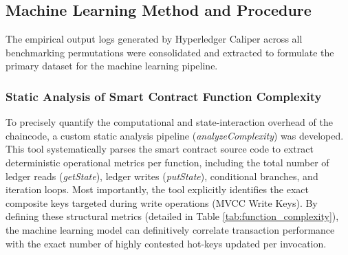 \documentclass[12pt]{article}
\begin{document}
\subsection{Machine Learning Method and Procedure}

The empirical output logs generated by Hyperledger Caliper across all benchmarking permutations were consolidated and extracted to formulate the primary dataset for the machine learning pipeline.

\subsubsection{Static Analysis of Smart Contract Function Complexity}

To precisely quantify the computational and state-interaction overhead of the chaincode, a custom static analysis pipeline (\textit{analyzeComplexity}) was developed. This tool systematically parses the smart contract source code to extract deterministic operational metrics per function, including the total number of ledger reads (\textit{getState}), ledger writes (\textit{putState}), conditional branches, and iteration loops. Most importantly, the tool explicitly identifies the exact composite keys targeted during write operations (MVCC Write Keys). By defining these structural metrics (detailed in Table \ref{tab:function_complexity}), the machine learning model can definitively correlate transaction performance with the exact number of highly contested hot-keys updated per invocation.

\begin{table}[ht]
\centering
\caption{Static Analysis of Smart Contract Function Complexity and MVCC Hot-Keys}
\label{tab:function_complexity}
\end{table}
 
\end{document}
